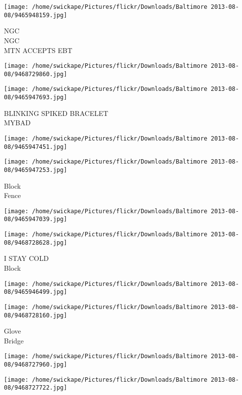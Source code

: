 \documentclass[10pt,letterpaper]{article}
\begin{document}
\texttt{[image: /home/swickape/Pictures/flickr/Downloads/Baltimore 2013-08-08/9465948159.jpg]}

NGC\\
NGC\\
MTN ACCEPTS EBT\\
\pagebreak

\texttt{[image: /home/swickape/Pictures/flickr/Downloads/Baltimore 2013-08-08/9468729860.jpg]}

\vspace{0.25in}
\texttt{[image: /home/swickape/Pictures/flickr/Downloads/Baltimore 2013-08-08/9465947693.jpg]}

BLINKING SPIKED BRACELET\\
MYBAD\\
\pagebreak

\texttt{[image: /home/swickape/Pictures/flickr/Downloads/Baltimore 2013-08-08/9465947451.jpg]}

\vspace{0.25in}
\texttt{[image: /home/swickape/Pictures/flickr/Downloads/Baltimore 2013-08-08/9465947253.jpg]}

Block\\
Fence\\
\pagebreak

\texttt{[image: /home/swickape/Pictures/flickr/Downloads/Baltimore 2013-08-08/9465947039.jpg]}

\vspace{0.25in}
\texttt{[image: /home/swickape/Pictures/flickr/Downloads/Baltimore 2013-08-08/9468728628.jpg]}

I STAY COLD\\
Block\\
\pagebreak

\texttt{[image: /home/swickape/Pictures/flickr/Downloads/Baltimore 2013-08-08/9465946499.jpg]}

\vspace{0.25in}
\texttt{[image: /home/swickape/Pictures/flickr/Downloads/Baltimore 2013-08-08/9468728160.jpg]}

Glove\\
Bridge\\
\pagebreak

\texttt{[image: /home/swickape/Pictures/flickr/Downloads/Baltimore 2013-08-08/9468727960.jpg]}

\vspace{0.25in}
\texttt{[image: /home/swickape/Pictures/flickr/Downloads/Baltimore 2013-08-08/9468727722.jpg]}
\end{document}
